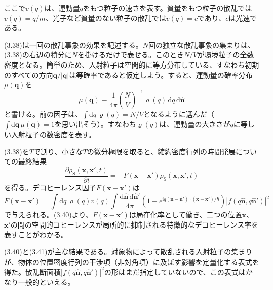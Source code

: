 \hypertarget{srcpage:127}{}\label{srcpage:127}
ここで$v(q)$は、運動量$q$をもつ粒子の速さを表す。質量をもつ粒子の散乱では$v(q)=q/m$、光子など質量のない粒子の散乱では$v(q)=c$であり、$c$は光速である。

(3.38)は一回の散乱事象の効果を記述する。$N$回の独立な散乱事象の集まりは、(3.38)の右辺の積分に$N$を掛けるだけで表せる。このとき$N/V$が環境粒子の全数密度となる。簡単のため、入射粒子は空間的に等方分布している、すなわち初期のすべての方向$\bm q/|\bm q|$は等確率であると仮定しよう。すると、運動量の確率分布$\mu(\bm q)$を
\begin{equation}
\mu(\bm q)\equiv\frac{1}{4\pi}\left(\frac{N}{V}\right)^{-1}\varrho(q)\,\mathrm dq\,\mathrm d\hat{\bm n}
\tag{3.39}
\end{equation}
と書ける。前の因子は、$\int\mathrm dq\,\varrho(q)=N/V$となるように選んだ（$\int\mathrm d\bm q\,\mu(\bm q)=1$を思い出そう）。すなわち$\varrho(q)$は、運動量の大きさが$q$に等しい入射粒子の数密度を表す。

(3.38)を$T$で割り、小さな$T$の微分極限を取ると、縮約密度行列の時間発展についての最終結果
\begin{equation}
\frac{\partial\rho_{\mathrm S}(\bm x,\bm x',t)}{\partial t}=-F(\bm x-\bm x')\rho_{\mathrm S}(\bm x,\bm x',t)
\tag{3.40}
\end{equation}
を得る。デコヒーレンス因子$F(\bm x-\bm x')$は
\begin{equation}
F(\bm x-\bm x')=\int\mathrm dq\,\varrho(q)v(q)\int\frac{\mathrm d\hat{\bm n}\,\mathrm d\hat{\bm n}'}{4\pi}
\left(1-e^{\mathrm iq(\hat{\bm n}-\hat{\bm n}')\cdot(\bm x-\bm x')/\hbar}\right)|f(q\hat{\bm n},q\hat{\bm n}')|^2
\tag{3.41}
\end{equation}
で与えられる。(3.40)より、$F(\bm x-\bm x')$は局在化率として働き、二つの位置$\bm x$、$\bm x'$の間の空間的コヒーレンスが局所的に抑制される特徴的なデコヒーレンス率を表すことがわかる。

(3.40)と(3.41)が主な結果である。対象物によって散乱される入射粒子の集まりが、物体の位置密度行列の干渉項（非対角項）に及ぼす影響を定量化する表式を得た。散乱断面積$|f(q\hat{\bm n},q\hat{\bm n}')|^2$の形はまだ指定していないので、この表式はかなり一般的といえる。

